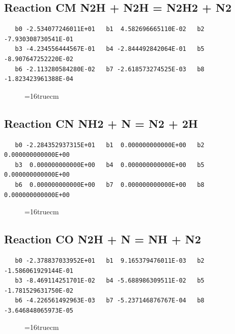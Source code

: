 \documentclass[12pt,dvipdfm]{article}
\begin{document}
\subsection{
Reaction CM N2H + N2H = N2H2 + N2 }
\begin{small}\begin{verbatim}
   b0 -2.534077246011E+01   b1  4.582696665110E-02   b2 -7.930308730541E-01
   b3 -4.234556444567E-01   b4 -2.844492842064E-01   b5 -8.907647252220E-02
   b6 -2.113280584280E-02   b7 -2.618573274525E-03   b8 -1.823423961388E-04
\end{verbatim}\end{small}
\begin{figure}[h!] \label{n2rates}
\epsfxsize=16truecm
\end{figure}
\newpage

\subsection{
Reaction CN NH2 + N = N2 + 2H }
\begin{small}\begin{verbatim}
   b0 -2.284352937315E+01   b1  0.000000000000E+00   b2  0.000000000000E+00
   b3  0.000000000000E+00   b4  0.000000000000E+00   b5  0.000000000000E+00
   b6  0.000000000000E+00   b7  0.000000000000E+00   b8  0.000000000000E+00
\end{verbatim}\end{small}
\begin{figure}[h!] \label{n2rates}
\epsfxsize=16truecm
\end{figure}
\newpage

\subsection{
Reaction CO N2H + N = NH + N2 }
\begin{small}\begin{verbatim}
   b0 -2.378837033952E+01   b1  9.165379476011E-03   b2 -1.586061929144E-01
   b3 -8.469114251701E-02   b4 -5.688986309511E-02   b5 -1.781529631750E-02
   b6 -4.226561492963E-03   b7 -5.237146876767E-04   b8 -3.646848065973E-05
\end{verbatim}\end{small}
\begin{figure}[h!] \label{n2rates}
\epsfxsize=16truecm
\end{figure}
\newpage
\end{document}
